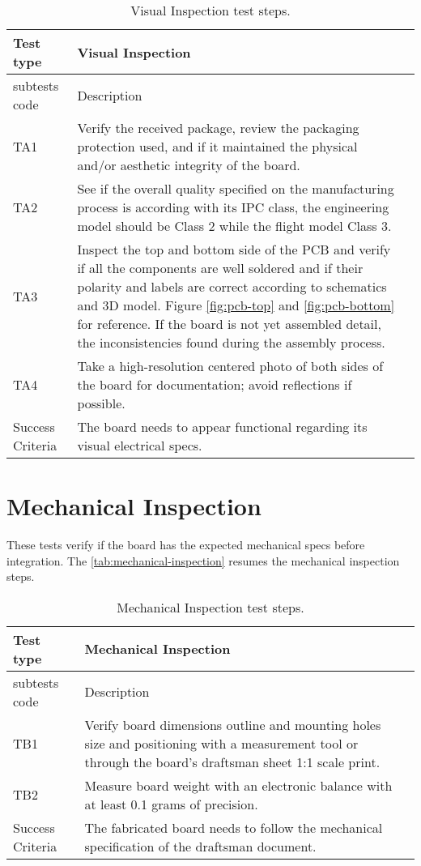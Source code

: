 \begin{table}[!htb]
\centering
\caption{Visual Inspection test steps.}
\label{tab:visual-inspection}
\begin{tabular}{m{3cm} m{12cm} m{3cm}}
\toprule
Test type & Visual Inspection \\
\midrule
\midrule
subtests code & Description \\ 
\midrule
TA1 & Verify the received package, review the packaging protection used, and if it maintained the physical and/or aesthetic integrity of the board. \\
\midrule
TA2 & See if the overall quality specified on the manufacturing process is according with its IPC class, the engineering model should be Class 2 while the flight model Class 3. \\
\midrule
TA3 & Inspect the top and bottom side of the PCB and verify if all the components are well soldered and if their polarity and labels are correct according to schematics and 3D model. Figure \ref{fig:pcb-top} and \ref{fig:pcb-bottom} for reference. If the board is not yet assembled detail, the inconsistencies found during the assembly process. \\
\midrule
TA4 & Take a high-resolution centered photo of both sides of the board for documentation; avoid reflections if possible. \\
\midrule
\midrule
Success Criteria & The board needs to appear functional regarding its visual electrical specs. \\
\bottomrule
\end{tabular}
\end{table}

\section {Mechanical Inspection}

These tests verify if the board has the expected mechanical specs before integration. The \autoref{tab:mechanical-inspection} resumes the mechanical inspection steps. 

\begin{table}[!htb]
\centering
\caption{Mechanical Inspection test steps.}
\label{tab:mechanical-inspection}
\begin{tabular}{m{3cm} m{12cm} m{3cm}}
\toprule
Test type & Mechanical Inspection \\
\midrule
\midrule
subtests code & Description \\ 
\midrule
TB1 & Verify board dimensions outline and mounting holes size and positioning with a measurement tool or through the board's draftsman sheet 1:1 scale print. \\
\midrule
TB2 & Measure board weight with an electronic balance with at least 0.1 grams of precision. \\
\midrule
\midrule
Success Criteria & The fabricated board needs to follow the mechanical specification of the draftsman document. \\
\bottomrule
\end{tabular}
\end{table}

